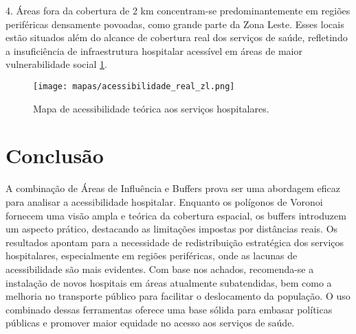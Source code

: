\documentclass[
  8pt,
]{article}
\begin{document}
\begin{multicols}{2}
4. Áreas fora da cobertura de 2 km concentram-se predominantemente em regiões periféricas densamente povoadas, como grande parte da Zona Leste. Esses locais estão situados além do alcance de cobertura real dos serviços de saúde, refletindo a insuficiência de infraestrutura hospitalar acessível em áreas de maior vulnerabilidade social \cref{fig:acessibilidade_real_zl}.

\begin{figure}[H]
    \centering
    \texttt{[image: mapas/acessibilidade\_real\_zl.png]}
    \caption{Mapa de acessibilidade teórica aos serviços hospitalares.}
    \label{fig:acessibilidade_real_zl}
\end{figure}


\section{Conclusão}

A combinação de Áreas de Influência e Buffers prova ser uma abordagem eficaz para analisar a acessibilidade hospitalar. Enquanto os polígonos de Voronoi fornecem uma visão ampla e teórica da cobertura espacial, os buffers introduzem um aspecto prático, destacando as limitações impostas por distâncias reais. Os resultados apontam para a necessidade de redistribuição estratégica dos serviços hospitalares, especialmente em regiões periféricas, onde as lacunas de acessibilidade são mais evidentes.
Com base nos achados, recomenda-se a instalação de novos hospitais em áreas atualmente subatendidas, bem como a melhoria no transporte público para facilitar o deslocamento da população. O uso combinado dessas ferramentas oferece uma base sólida para embasar políticas públicas e promover maior equidade no acesso aos serviços de saúde.

\end{multicols}
\end{document}
